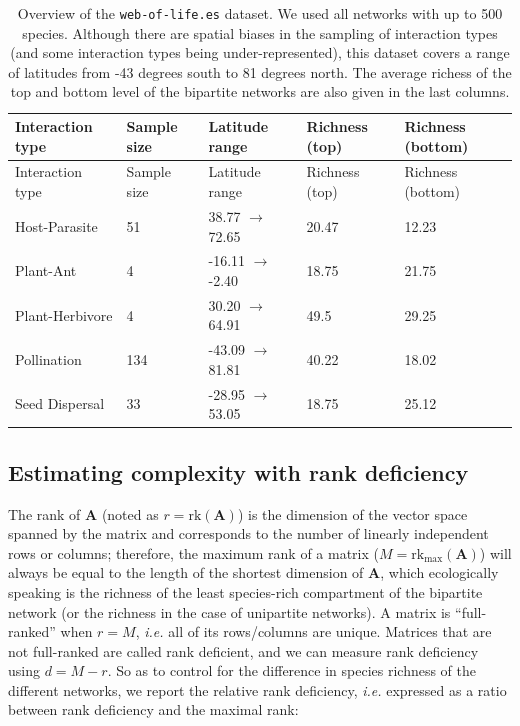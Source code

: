 \documentclass[11pt]{article}
\begin{document}
\hypertarget{tbl:summary}{}
\begin{longtable}[]{@{}lllll@{}}
\caption{\label{tbl:summary}Overview of the \texttt{web-of-life.es}
dataset. We used all networks with up to 500 species. Although there are
spatial biases in the sampling of interaction types (and some
interaction types being under-represented), this dataset covers a range
of latitudes from -43 degrees south to 81 degrees north. The average
richess of the top and bottom level of the bipartite networks are also
given in the last columns.}\tabularnewline
\toprule
Interaction type & Sample size & Latitude range & Richness (top) &
Richness (bottom)\tabularnewline
\midrule
\endfirsthead
\toprule
Interaction type & Sample size & Latitude range & Richness (top) &
Richness (bottom)\tabularnewline
\midrule
\endhead
Host-Parasite & 51 & 38.77 \(\rightarrow\) 72.65 & 20.47 &
12.23\tabularnewline
Plant-Ant & 4 & -16.11 \(\rightarrow\) -2.40 & 18.75 &
21.75\tabularnewline
Plant-Herbivore & 4 & 30.20 \(\rightarrow\) 64.91 & 49.5 &
29.25\tabularnewline
Pollination & 134 & -43.09 \(\rightarrow\) 81.81 & 40.22 &
18.02\tabularnewline
Seed Dispersal & 33 & -28.95 \(\rightarrow\) 53.05 & 18.75 &
25.12\tabularnewline
\bottomrule
\end{longtable}

\hypertarget{estimating-complexity-with-rank-deficiency}{%
\subsection{Estimating complexity with rank
deficiency}\label{estimating-complexity-with-rank-deficiency}}

The rank of \(\mathbf{A}\) (noted as \(r = \text{rk}(\mathbf{A})\)) is
the dimension of the vector space spanned by the matrix and corresponds
to the number of linearly independent rows or columns; therefore, the
maximum rank of a matrix (\(M = \text{rk}_{\text{max}}(\mathbf{A})\))
will always be equal to the length of the shortest dimension of
\(\mathbf{A}\), which ecologically speaking is the richness of the least
species-rich compartment of the bipartite network (or the richness in
the case of unipartite networks). A matrix is ``full-ranked'' when
\(r=M\), \emph{i.e.} all of its rows/columns are unique. Matrices that
are not full-ranked are called rank deficient, and we can measure rank
deficiency using \(d = M-r\). So as to control for the difference in
species richness of the different networks, we report the relative rank
deficiency, \emph{i.e.} expressed as a ratio between rank deficiency and
the maximal rank:
\end{document}
